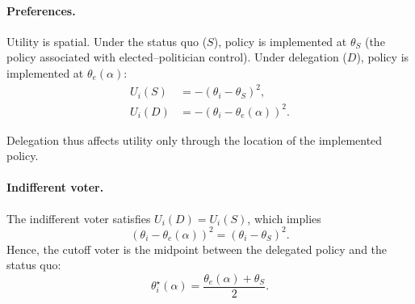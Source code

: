 \documentclass[11pt]{article}\usepackage[]{graphicx}\usepackage[]{xcolor}
\begin{document}

\paragraph{Preferences.}

Utility is spatial. Under the status quo ($S$), policy is implemented at $\theta_S$ (the policy associated with elected--politician control). Under delegation ($D$), policy is implemented at $\theta_e(\alpha)$:
\begin{align*}
U_i(S) &= -(\theta_i - \theta_S)^2,\\
U_i(D) &= -(\theta_i - \theta_e(\alpha))^2.
\end{align*}

Delegation thus affects utility only through the location of the implemented policy.

\paragraph{Indifferent voter.}

The indifferent voter satisfies $U_i(D)=U_i(S)$, which implies
\[
(\theta_i - \theta_e(\alpha))^2 = (\theta_i - \theta_S)^2.
\]
Hence, the cutoff voter is the midpoint between the delegated policy and the status quo:
\[
\theta_i^\star(\alpha)
=
\frac{\theta_e(\alpha)+\theta_S}{2}.
\]
\end{document}
